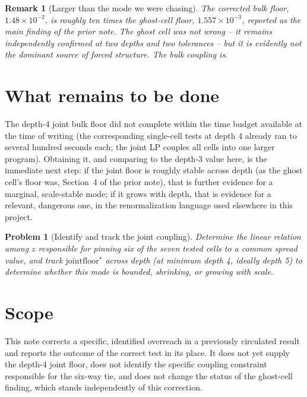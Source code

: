 \documentclass[11pt,a4paper]{article}
\newtheorem{problem}{Problem}
\newtheorem{remark}{Remark}
\begin{document}
\begin{remark}[Larger than the mode we were chasing]
The corrected bulk floor, $1.48\times10^{-2}$, is roughly ten times the
ghost-cell floor, $1.557\times10^{-3}$, reported as the main finding of the
prior note. The ghost cell was not wrong -- it remains independently
confirmed at two depths and two tolerances -- but it is evidently not the
dominant source of forced structure. The bulk coupling is.
\end{remark}

\section{What remains to be done}

The depth-4 joint bulk floor did not complete within the time budget
available at the time of writing (the corresponding single-cell tests at
depth 4 already ran to several hundred seconds each; the joint LP couples
all cells into one larger program). Obtaining it, and comparing to the
depth-3 value here, is the immediate next step: if the joint floor is
roughly stable across depth (as the ghost cell's floor was, Section~4 of
the prior note), that is further evidence for a marginal, scale-stable
mode; if it grows with depth, that is evidence for a relevant, dangerous
one, in the renormalization language used elsewhere in this project.

\begin{problem}[Identify and track the joint coupling]
Determine the linear relation among $z$ responsible for pinning six of the
seven tested cells to a common spread value, and track
$\mathrm{jointfloor}^\star$ across depth (at minimum depth 4, ideally depth
5) to determine whether this mode is bounded, shrinking, or growing with
scale.
\end{problem}

\section{Scope}

This note corrects a specific, identified overreach in a previously
circulated result and reports the outcome of the correct test in its
place. It does not yet supply the depth-4 joint floor, does not identify
the specific coupling constraint responsible for the six-way tie, and does
not change the status of the ghost-cell finding, which stands independently
of this correction.
\end{document}
